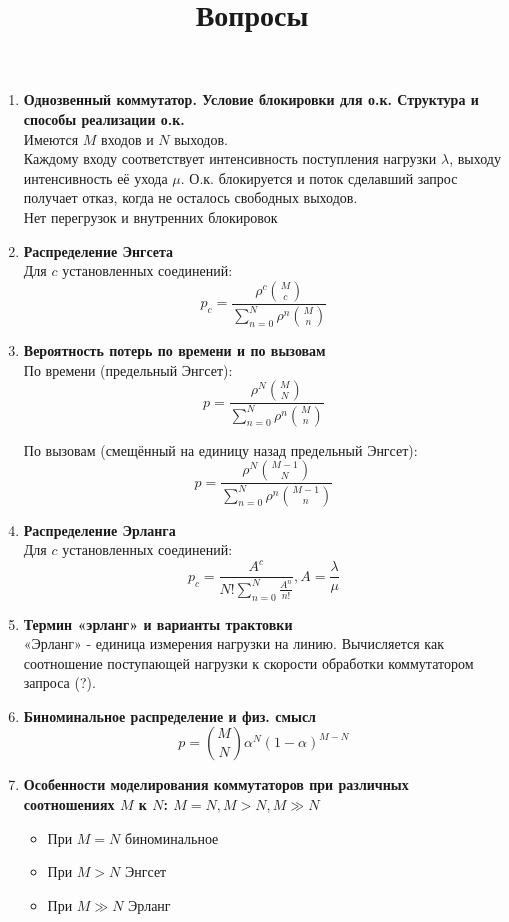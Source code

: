 \documentclass[12pt]{article}
\begin{document}
\title{Вопросы}
\date{}
\maketitle

\begin{enumerate}

	\item \textbf{Однозвенный коммутатор. Условие блокировки для о.к. Структура и способы реализации о.к.} \\ 
	Имеются $M$ входов и $N$ выходов.\\
	Каждому входу соответствует интенсивность поступления нагрузки $\lambda$, выходу интенсивность её ухода $\mu$. 
	О.к. блокируется и поток сделавший запрос получает отказ, когда не осталось свободных выходов. \\
	Нет перегрузок и внутренних блокировок

	\item \textbf{Распределение Энгсета} \\
	Для $c$ установленных соединений:
	 \[
		 p_c = \frac{\rho ^ c \binom{M}{c}}
		 {\sum_{n=0}^{N} \rho ^ n \binom{M}{n}}
	 \]

	\item \textbf{Вероятность потерь по времени и по вызовам} \\
	По времени (предельный Энгсет):
	\[
 		p = \frac{\rho ^ N \binom{M}{N}}
 		{\sum_{n=0}^{N} \rho ^ n \binom{M}{n}}
	\]

	По вызовам (смещённый на единицу назад предельный Энгсет):
	\[
 		p = \frac{\rho ^ N \binom{M - 1}{N}}
 		{\sum_{n=0}^{N} \rho ^ n \binom{M - 1}{n}}
	\]

		
	\item \textbf{Распределение Эрланга} \\
	Для $c$ установленных соединений:
	\[
	 	p_c = \frac{A ^ c}
	 	{N!\sum_{n=0}^{N} \frac{A ^ n}{n!}}, A = \frac{\lambda}{\mu}
	\]

	\item \textbf{Термин «эрланг» и варианты трактовки } \\
	«Эрланг» - единица измерения нагрузки на линию. Вычисляется как соотношение поступающей нагрузки к скорости обработки коммутатором запроса (?).

	\item \textbf{Биноминальное распределение и физ. смысл}
		\[
		 	p = \binom{M}{N} \alpha ^ N (1 - \alpha) ^ {M - N}
		\]
	\item \textbf{Особенности моделирования коммутаторов при различных соотношениях $M$ к $N$: $M = N, M > N, M ≫ N$} \\
	\begin{itemize}
		\item При $M = N$ биноминальное
		\item При $M > N$ Энгсет
		\item При $M ≫ N$ Эрланг
	\end{itemize}
	

\end{enumerate}
\end{document}
